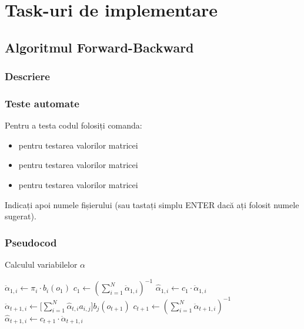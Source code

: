 \documentclass[12pt]{article}
\begin{document}
\section{Task-uri de implementare}
\label{sec:tasks}

\subsection{Algoritmul Forward-Backward}
\label{sec:fb}

\subsubsection{Descriere}
\label{sec:descr-fb}



\subsubsection{Teste automate}
\label{sec:tester-fb}

Pentru a testa codul folosiți comanda:
\begin{itemize}
\item {} pentru testarea valorilor matricei 
\item {} pentru testarea valorilor matricei 
\item {} pentru testarea valorilor matricei 
\end{itemize}
Indicați apoi numele
fișierului (sau tastați simplu ENTER dacă ați folosit numele sugerat).

\subsubsection{Pseudocod}
\label{sec:pseudocod-fb}

\begin{algorithm}[H]
  \caption{Calculul variabilelor $\alpha$}
  \label{alg1:alpha}
  \begin{algorithmic}[2]
     \STATE $\ddot{\alpha}_{1,i} \leftarrow
    \pi_i \cdot b_i(o_1)$
    \ENDFOR
    \STATE $c_1 \leftarrow (\displaystyle\sum_{i=1}^{N}
    \ddot{\alpha}_{1,i})^{-1}$  \STATE
    $\hat{\alpha}_{1,i} \leftarrow c_1 \cdot \ddot{\alpha}_{1,i}$
    \ENDFOR
      \STATE
    $\ddot{\alpha}_{t+1,i} \leftarrow \Big[
    \displaystyle\sum_{i=1}^{N}\hat{\alpha}_{t,i}a_{i,j}\Big]
    b_{j}(o_{t+1})$
    \ENDFOR
    \STATE $c_{t+1} \leftarrow (\displaystyle\sum_{i=1}^{N}
    \ddot{\alpha}_{t+1,i})^{-1}$  \STATE
    $\hat{\alpha}_{t+1,i} \leftarrow c_{t+1} \cdot
    \ddot{\alpha}_{t+1,i}$
    \ENDFOR
    \ENDFOR
  \end{algorithmic}
\end{algorithm}
\end{document}
